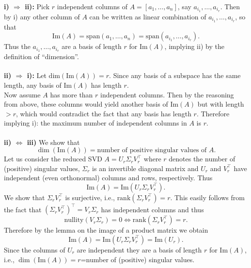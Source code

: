{\color{solution}
\textbf{i) $\Rightarrow$ ii):} Pick $r$ independent columns of $A = [a_1,\ldots,a_n]$, say $a_{i_1},\ldots,a_{i_r}$. Then by i) any other column of $A$ can be written as linear combination of $a_{i_1},\ldots,a_{i_r}$, so that $$\text{Im}(A)= \text{span}(a_{1},\ldots,a_{n})= \text{span}(a_{i_1},\ldots,a_{i_r}).$$ Thus the $a_{i_1},\ldots,a_{i_r}$ are a basis of length $r$ for $\text{Im}(A)$, implying ii) by the definition of ``dimension''.\\~\\
\textbf{ii) $\Rightarrow$ i):} 
Let $\text{dim}(\text{Im}(A))= r$. Since any basis of a subspace has the same length, any basis of $\text{Im}(A)$ has length $r$.\\
Now assume $A$ has more than $r$ independent columns. Then by the reasoning from above, these columns would yield another basis of $\text{Im}(A)$ but with length $>r$, which would contradict the fact that any basis has length $r$. Therefore implying i): the maximum number of independent columns in $A$ is $r$. \\~\\
\textbf{ii) $\Leftrightarrow$ iii)} We show that $$\dim(\text{Im}(A)) = \text{number of positive singular values of }A .$$
Let us consider the reduced SVD $A = U_r \Sigma_r V_r^\top$ where $r$ denotes the number of (positive) singular values, $\Sigma_r$ is an invertible diagonal matrix and $U_r$ and $V_r^\top$ have independent (even orthonormal) columns and rows, respectively. Thus
$$\text{Im}(A) = \text{Im}(U_r \Sigma_r V_r^\top). $$
We show that $\Sigma_r V_r^\top$ is surjective, i.e., $\text{rank}(\Sigma_r V_r^\top) = r$. This easily follows from the fact that $(\Sigma_r V_r^\top)^\top = V_r\Sigma_r $ has independent columns and thus $$\text{nullity}(V_r\Sigma_r) = 0 \Leftrightarrow \text{rank}(\Sigma_r V_r^\top) = r.$$ Therefore by the lemma on the image of a product matrix we obtain
$$\text{Im}(A) = \text{Im}(U_r \Sigma_r V_r^\top)= \text{Im}(U_r).$$
Since the columns of $U_r$ are independent they are a basis of length $r$ for $\text{Im}(A)$, i.e., $\dim(\text{Im}(A))=r$=number of (positive) singular values.

}
